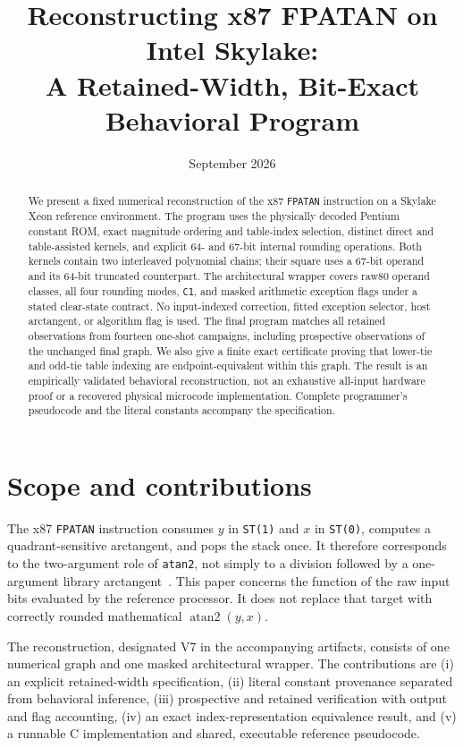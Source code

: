 \documentclass[11pt]{article}
\title{Reconstructing x87 FPATAN on Intel Skylake:\\
A Retained-Width, Bit-Exact Behavioral Program}
\author{}
\date{September 2026}
\newcommand{\insn}[1]{\texttt{#1}}
\begin{document}
\maketitle

\begin{abstract}
We present a fixed numerical reconstruction of the x87 \insn{FPATAN}
instruction on a Skylake Xeon reference environment. The program uses the
physically decoded Pentium constant ROM, exact magnitude ordering and
table-index selection, distinct direct and table-assisted kernels, and
explicit 64- and 67-bit internal rounding operations. Both kernels contain
two interleaved polynomial chains; their square uses a 67-bit operand and
its 64-bit truncated counterpart. The architectural wrapper covers raw80
operand classes, all four rounding modes, \insn{C1}, and masked arithmetic
exception flags under a stated clear-state contract. No input-indexed
correction, fitted exception selector, host arctangent, or algorithm flag
is used. The final program matches all \CorpusRows{} retained observations
from fourteen one-shot campaigns, including \ProspectiveRows{} prospective
observations of the unchanged final graph. We also give a finite exact
certificate proving that lower-tie and odd-tie table indexing are
endpoint-equivalent within this graph. The result is an empirically
validated behavioral reconstruction, not an exhaustive all-input hardware
proof or a recovered physical microcode implementation. Complete programmer's
pseudocode and the literal constants accompany the specification.
\end{abstract}

\section{Scope and contributions}

The x87 \insn{FPATAN} instruction consumes $y$ in \insn{ST(1)} and $x$ in
\insn{ST(0)}, computes a quadrant-sensitive arctangent, and pops the stack
once. It therefore corresponds to the two-argument role of \texttt{atan2},
not simply to a division followed by a one-argument library
arctangent~\cite{intel2}. This paper concerns the function of the raw input
bits evaluated by the reference processor. It does not replace that target
with correctly rounded mathematical $\operatorname{atan2}(y,x)$.

The reconstruction, designated V7 in the accompanying artifacts, consists
of one numerical graph and one masked architectural wrapper. The
contributions are (i) an explicit retained-width specification, (ii) literal
constant provenance separated from behavioral inference, (iii) prospective
and retained verification with output and flag accounting, (iv) an exact
index-representation equivalence result, and (v) a runnable C implementation
and shared, executable reference pseudocode.
\end{document}
